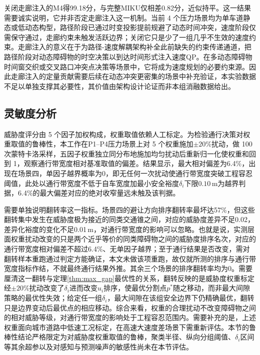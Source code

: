 \documentclass[a4paper,11pt]{ctexart}
\theoremstyle{definition}
\begin{document}
关闭走廊注入的M4得99.18分，与完整MIKU仅相差0.82分，近似持平。这一结果需要诚实说明，它并非否定走廊注入这一机制。当前 4 个压力场景均为单车道静态或低动态构型，路径阶段已通过时变投影提前规避了动态时间冲突，速度阶段仅需保守通过，走廊约束未触发活跃边界；关闭它只是少了一组几乎不生效的速度约束。走廊注入的意义在于为路径-速度解耦架构补全此前缺失的约束传递通道，把路径阶段对动态障碍物的时空决策以到达时间形式注入速度QP。在多动态障碍物时间窗交织或交叉路口冲突点决策等场景中，它将成为速度规划的必要约束源。因此走廊注入的定量贡献需要后续在动态冲突更密集的场景中补充验证，本实验数据不足以单独支撑其必要性，其价值由架构设计论证而非本组消融数据给出。

\subsection{灵敏度分析}
\label{subsec:exp_sensitivity}

威胁度评分由 5 个因子加权构成，权重取值依赖人工标定。为检验通行决策对权重取值的鲁棒性，本工作在P1--P4压力场景上对 5 个权重施加$\pm 20\%$扰动，做 100 次蒙特卡洛采样，五因子权重独立同分布地施加均匀扰动后重新归一化使权重和回到 1，观察通行带宽度相对基准取值的偏差。结果显示，最大相对偏差为6.4\%，出现在场景四，单因子越界概率为0，即无任何一次扰动使通行带宽度突破工程容忍阈值，此处以通行带宽度不低于自车宽度加最小安全裕度$\delta_i$下限$0.10$\,m为越界判据，6.4\%的最大偏差对应的绝对收窄量远未触及该判据。

需要单独说明翻转率这一指标。场景四的避让方向排序翻转率最坏达57\%，但这些翻转集中发生在威胁度极为接近的同类交通锥之间，对应的威胁度差异不足0.02，差异化裕度的变化不足0.01\,m，对通行带宽度的影响可以忽略。也就是说，实测层面权重扰动改变的只是两个近乎等价的同类障碍物之间的威胁度排序名次，对应的通行带宽度相对偏差不超过6.4\%、无单因子越界；至于通行结果是否改变，需对翻转样本重跑通过判定方能确证，本文未做该项重跑，故仅就所测的排序与通行带宽度指标作结，不就最终通行结果外推。其余三个场景的排序翻转率均为0。需要厘清这一翻转与定理\ref{thm:max_gap}最优性的关系，翻转反映的是威胁度权重标定经$\pm20\%$扰动改变了$\delta_i$进而改变$u_i$排序，使最优分割点$p^{*}$随之移动，而非最大间隙策略的最优性失效；给定任一组$\delta_i$，最大间隙在该组安全边界下仍精确最优，翻转只是边界变动后最优点的相应移动。综合来看，权重的合理扰动不改变障碍物之间的相对威胁等级，对通行带宽度的影响处于工程容忍范围内。需要补充的是，上述权重面向城市道路中低速工况标定，在高速大速度差场景下需重新评估。本节的鲁棒性结论严格限定为对威胁度权重取值的鲁棒，聚类半径、纵向分组阈值、$\delta_i$区间等其余超参以及对感知与预测噪声的敏感性尚未在本节评估。
\end{document}

